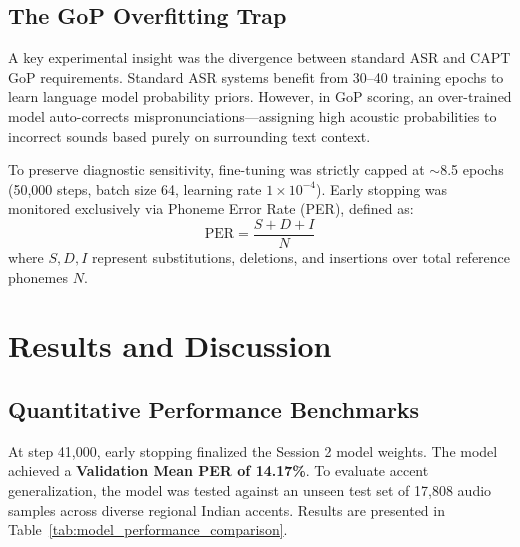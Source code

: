 \documentclass[11pt,a4paper]{article}
\begin{document}
\subsection{The GoP Overfitting Trap}
A key experimental insight was the divergence between standard ASR and CAPT GoP requirements. Standard ASR systems benefit from 30--40 training epochs to learn language model probability priors. However, in GoP scoring, an over-trained model auto-corrects mispronunciations—assigning high acoustic probabilities to incorrect sounds based purely on surrounding text context. 

To preserve diagnostic sensitivity, fine-tuning was strictly capped at $\sim$8.5 epochs (50,000 steps, batch size 64, learning rate $1\times 10^{-4}$). Early stopping was monitored exclusively via Phoneme Error Rate (PER), defined as:
\begin{equation}
    \text{PER} = \frac{S + D + I}{N}
\end{equation}
where $S, D, I$ represent substitutions, deletions, and insertions over total reference phonemes $N$.

\section{Results and Discussion}\label{sec6}

\subsection{Quantitative Performance Benchmarks}
At step 41,000, early stopping finalized the Session 2 model weights. The model achieved a \textbf{Validation Mean PER of 14.17\%}. To evaluate accent generalization, the model was tested against an unseen test set of 17,808 audio samples across diverse regional Indian accents. Results are presented in Table~\ref{tab:model_performance_comparison}.
\end{document}
